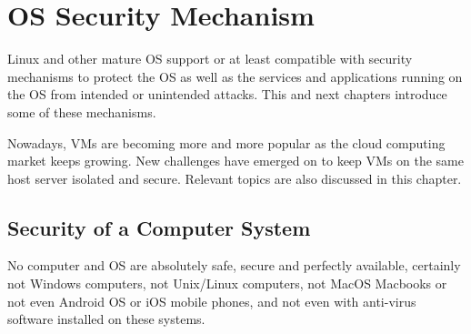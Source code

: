 \chapter{OS Security Mechanism}

Linux and other mature OS support or at least compatible with security mechanisms to protect the OS as well as the services and applications running on the OS from intended or unintended attacks. This and next chapters introduce some of these mechanisms.

Nowadays, VMs are becoming more and more popular as the cloud computing market keeps growing. New challenges have emerged on to keep VMs on the same host server isolated and secure. Relevant topics are also discussed in this chapter.

\section{Security of a Computer System}

No computer and OS are absolutely safe, secure and perfectly available, certainly not Windows computers, not Unix/Linux computers, not MacOS Macbooks or not even Android OS or iOS mobile phones, and not even with anti-virus software installed on these systems.



